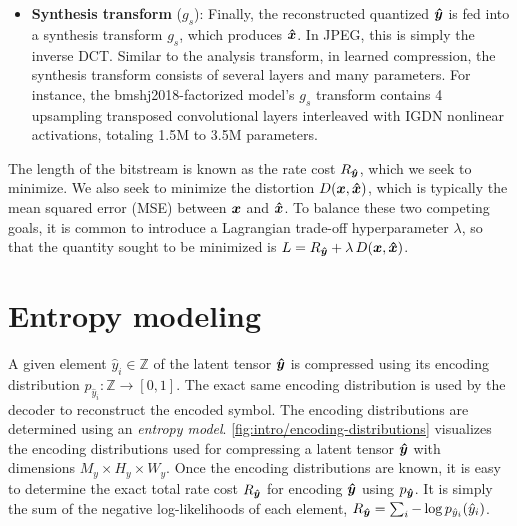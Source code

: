 \begin{itemize}
  \item \textbf{Synthesis transform} ($g_s$):
    Finally, the reconstructed quantized ${\boldsymbol{\hat{y}}}$ is fed into a synthesis transform $g_s$, which produces ${\boldsymbol{\hat{x}}}$.
    In JPEG, this is simply the inverse DCT.
    Similar to the analysis transform, in learned compression, the synthesis transform consists of several layers and many parameters.
    For instance, the bmshj2018-factorized model's $g_s$ transform contains 4 upsampling transposed convolutional layers interleaved with IGDN nonlinear activations, totaling 1.5M to 3.5M parameters.
\end{itemize}

The length of the bitstream is known as the rate cost $R_{{\boldsymbol{\hat{y}}}}$, which we seek to minimize. %
We also seek to minimize the distortion $D({\boldsymbol{x}}, {\boldsymbol{\hat{x}}})$, which is typically the mean squared error (MSE) between ${\boldsymbol{x}}$ and ${\boldsymbol{\hat{x}}}$.
To balance these two competing goals, it is common to introduce a Lagrangian trade-off hyperparameter $\lambda$, so that the quantity sought to be minimized is $L = R_{{\boldsymbol{\hat{y}}}} + \lambda \, D({\boldsymbol{x}}, {\boldsymbol{\hat{x}}})$.



%
%




\section{Entropy modeling}

A given element $\hat{y}_i \in \mathbb{Z}$ of the latent tensor ${\boldsymbol{\hat{y}}}$ is compressed using its encoding distribution $p_{{\hat{y}}_i} : \mathbb{Z} \to [0, 1]$.
The exact same encoding distribution is used by the decoder to reconstruct the encoded symbol.
The encoding distributions are determined using an \emph{entropy model}.
\cref{fig:intro/encoding-distributions} visualizes the encoding distributions used for compressing a latent tensor ${\boldsymbol{\hat{y}}}$ with dimensions $M_y \times H_y \times W_y$.
Once the encoding distributions are known, it is easy to determine the exact total rate cost $R_{{\boldsymbol{\hat{y}}}}$ for encoding ${\boldsymbol{\hat{y}}}$ using $p_{{\boldsymbol{\hat{y}}}}$.
It is simply the sum of the negative log-likelihoods of each element, $R_{{\boldsymbol{\hat{y}}}} = \sum_i -\log p_{{\hat{y}}_i}({\hat{y}}_i)$.


